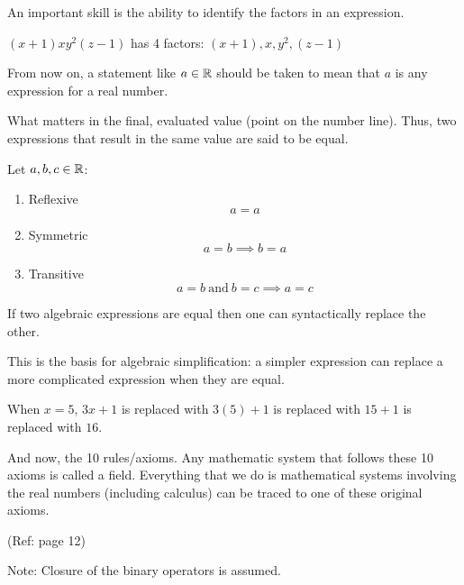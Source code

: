\documentclass[letterpaper,12pt,fleqn]{article}
\begin{document}
\bigskip

An important skill is the ability to identify the factors in an expression.

\begin{example}
  $(x+1)xy^2(z-1)$ has 4 factors: $(x+1), x, y^2, (z-1)$
\end{example}

From now on, a statement like $a\in\mathbb{R}$ should be taken to mean that $a$ is any
expression for a real number.

What matters in the final, evaluated value (point on the number line). Thus,
two expressions that result in the same value are said to be equal.

\begin{properties}[Equality]
  Let $a,b,c\in\mathbb{R}$:
  \begin{enumerate}
  \item Reflexive
    \[a=a\]
  \item Symmetric
    \[a=b\implies b=a\]
  \item Transitive
    \[a=b\ \mbox{and}\ b=c\implies a=c\]
  \end{enumerate}
\end{properties}

\begin{axiom}
  If two algebraic expressions are equal then one can syntactically replace
  the other.
\end{axiom}

This is the basis for algebraic simplification: a simpler expression can
replace a more complicated expression when they are equal.

\begin{example}
  When $x=5$, $3x+1$ is replaced with $3(5)+1$ is replaced with $15+1$ is
  replaced with $16$.
\end{example}

And now, the 10 rules/axioms. Any mathematic system that follows these 10
axioms is called a field. Everything that we do is mathematical systems
involving the real numbers (including calculus) can be traced to one of these
original axioms.

(Ref: page 12)

Note: Closure of the binary operators is assumed.
\end{document}
